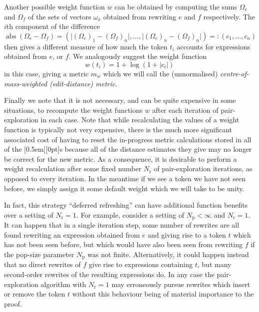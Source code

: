 \documentclass[a4paper]{article}
\DeclareMathOperator{\abss}{abs}
\theoremstyle{plain}
\theoremstyle{definition}
\newcommand{\xx}[1]{{\colorbox{gray!15}{\raisebox{0em}[0.5em][0pt]{\makebox[\width-0.4em]{\texttt{#1}}}}}}
\begin{document}
Another possible weight function $w$ can be obtained by computing the sums $\Omega_e$ and $\Omega_f$ of the sets of vectors $\omega_x$ obtained from rewriting $e$ and $f$ respectively. The $i$th component of the difference
\begin{equation*}
  \abss(\Omega_e - \Omega_f) = (\lvert (\Omega_e)_1 - (\Omega_f)_n \rvert, \ldots, \lvert (\Omega_e)_n - (\Omega_f)_n \rvert) =: (c_1, \ldots, c_n)
\end{equation*}
then gives a different measure of how much the token $t_i$ accounts for expressions obtained from $e$, or $f$. We analogously suggest the weight function
\begin{equation*}
  w(t_i) = 1 + \log(1 + \lvert c_i \rvert)
\end{equation*}
in this case, giving a metric $m_w$ which we will call the (unnormalised) \textit{centre-of-mass-weighted (edit-distance) metric}.

Finally we note that it is not necessary, and can be quite expensive in some situations, to recompute the weight functions $w$ after each iteration of pair-exploration in each case. Note that while recalculating the values of a weight function is typically not very expensive, there is the much more significant associated cost of having to reset the in-progress metric calculations stored in all of the \xx{dist\_est}s because all of the distance estimates they give may no longer be correct for the new metric. As a consequence, it is desirable to perform a weight recalculation after some fixed number $N_\text{r}$ of pair-exploration iterations, as opposed to every iteration. In the meantime if we see a token we have not seen before, we simply assign it some default weight which we will take to be unity.

In fact, this strategy ``deferred refreshing'' can have additional function benefits over a setting of $N_\text{r} = 1$. For example, consider a setting of $N_\text{p} < \infty$ and $N_\text{r} = 1$. It can happen that in a single iteration step, some number of rewrites are all found rewriting an expression obtained from $e$ and giving rise to a token $t$ which has not been seen before, but which would have also been seen from rewriting $f$ if the pop-size parameter $N_\text{p}$ was not finite. Alternatively, it could happen instead that no direct rewrites of $f$ give rise to expressions containing $t$, but many second-order rewrites of the resulting expressions do. In any case the pair-exploration algorithm with $N_\text{r} = 1$ may erroneously pursue rewrites which insert or remove the token $t$ without this behaviour being of material importance to the proof.
\end{document}
